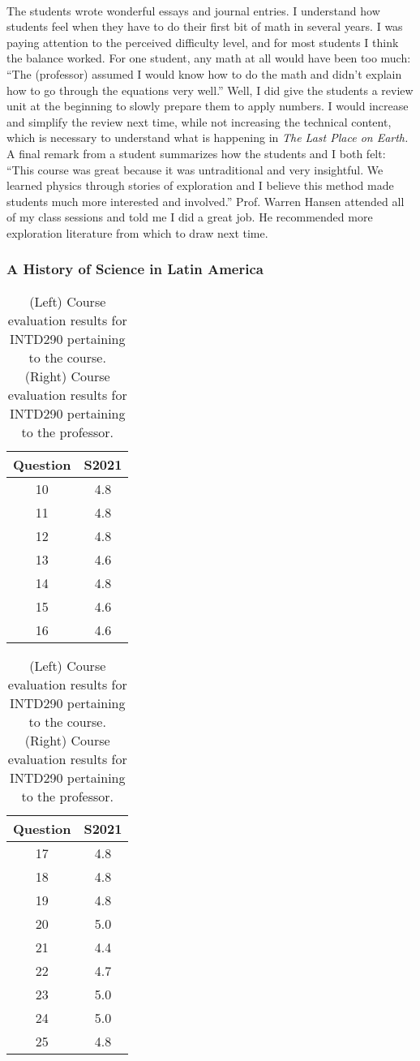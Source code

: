 \documentclass[../../../main.tex]{subfiles}
\begin{document}
\\
\vspace{0.25cm}
The students wrote wonderful essays and journal entries.  I understand how students feel when they have to do their first bit of math in several years.  I was paying attention to the perceived difficulty level, and for most students I think the balance worked.  For one student, any math at all would have been too much: ``The (professor) assumed I would know how to do the math and didn't explain how to go through the equations very well.''  Well, I did give the students a review unit at the beginning to slowly prepare them to apply numbers.  I would increase and simplify the review next time, while not increasing the technical content, which is necessary to understand what is happening in \textit{The Last Place on Earth.}  A final remark from a student summarizes how the students and I both felt: ``This course was great because it was untraditional and very insightful.  We learned physics through stories of exploration and I believe this method made students much more interested and involved.''  Prof. Warren Hansen attended all of my class sessions and told me I did a great job.  He recommended more exploration literature from which to draw next time.

\subsubsection{A History of Science in Latin America}

\begin{table}
\footnotesize
\centering
\begin{tabular}{| c | c |}
\hline
\hline
Question & S2021 \\ \hline
10 & 4.8 \\ \hline
11 & 4.8 \\ \hline
12 & 4.8 \\ \hline
13 & 4.6 \\ \hline
14 & 4.8 \\ \hline
15 & 4.6 \\ \hline
16 & 4.6 \\ \hline
\hline
\end{tabular}
\begin{tabular}{| c | c |}
\hline
\hline
Question & S2021 \\ \hline
17 & 4.8 \\ \hline
18 & 4.8 \\ \hline
19 & 4.8 \\ \hline
20 & 5.0 \\ \hline
21 & 4.4 \\ \hline
22 & 4.7 \\ \hline
23 & 5.0 \\ \hline
24 & 5.0 \\ \hline
25 & 4.8 \\ \hline
\hline
\end{tabular}
\caption{\label{tab:eval_290} (Left) Course evaluation results for INTD290 pertaining to the course.  (Right) Course evaluation results for INTD290 pertaining to the professor.}
\end{table}
\end{document}
